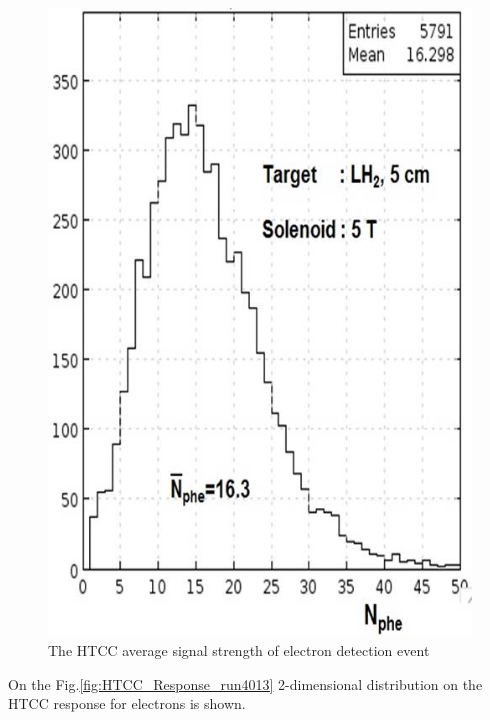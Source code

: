 \begin{figure}[!ht]
    \centering
    \includegraphics[width=1.0\linewidth,trim={0.0cm 0.0cm 0.0cm 0.0cm},clip]{images/Average_HTCC_Signal.jpg}
    \caption{The HTCC average signal strength of electron detection event}
    \label{fig:Average_HTCC_Signal}
\end{figure}
On the Fig.\ref{fig:HTCC_Response_run4013} 2-dimensional distribution on the HTCC response for electrons is shown.

